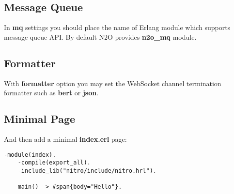 \newpage
\subsection*{Message Queue}
In {\bf mq} settings you should place the name of Erlang module which supports
message queue API. By default N2O provides {\bf n2o\_mq} module.

\subsection*{Formatter}
With {\bf formatter} option you may set the WebSocket channel
termination formatter such as {\bf bert} or {\bf json}.

\subsection*{Minimal Page}
And then add a minimal {\bf index.erl} page:

\vspace{1\baselineskip}
\begin{lstlisting}[caption=index.erl]
    -module(index).
    -compile(export_all).
    -include_lib("nitro/include/nitro.hrl").

    main() -> #span{body="Hello"}.
\end{lstlisting}
\vspace{1\baselineskip}

